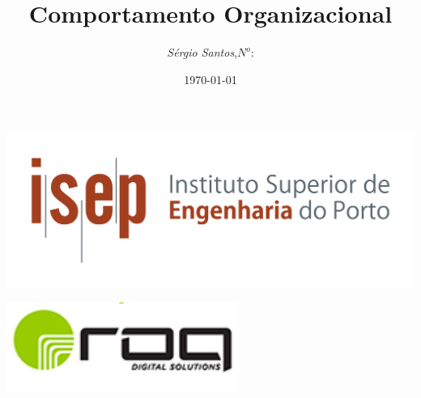\begin{minipage}{\linewidth}

\title{Comportamento Organizacional}
\author{
\emph{S\'{e}rgio Santos},\;$N^o$: \\
}
\date{\today}

\begin{titlepage}
\includegraphics[scale=0.60]{./image/capa/ISEP_marca_cor_grande.png}
\maketitle
\vspace{8cm}
\begin{flushleft}
\includegraphics[scale=0.50]{./image/ROQ/ROQ.jpg}
\end{flushleft}
\end{titlepage}

\end{minipage}
